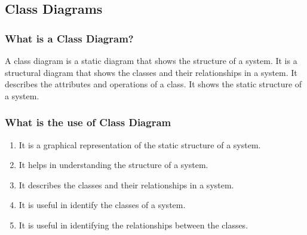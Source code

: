 \documentclass{article}
\begin{document}
\begin{enumerate}
\begin{center}
	\end{center}	
\end{enumerate}
\subsection{\textbf{Class Diagrams}}
\subsubsection{\textbf{What is a Class Diagram?}}
A class diagram is a static diagram that shows the structure of a system. It is a structural diagram that shows the
classes and their relationships in a system. It describes the attributes and operations of a class. It shows the static structure of a system.
\subsubsection{\textbf{What is the use of Class Diagram}}
\begin{enumerate}
	\item It is a graphical representation of the static structure of a system.
	\item It helps in understanding the structure of a system.
	\item It describes the classes and their relationships in a system.
	\item It is useful in identify the classes of a system.
	\item It is useful in identifying the relationships between the classes.
\end{enumerate}
\end{document}
